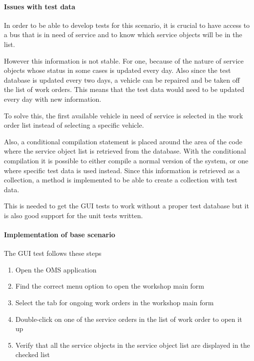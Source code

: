 \documentclass{article}
\begin{document}
				\paragraph{Issues with test data}
				
				In order to be able to develop tests for this scenario, it is crucial to have access to a bus that is in need of service and to know which service objects will be in the list. 

				However this information is not stable. For one, because of the nature of service objects whose status in some cases is updated every day. Also since the test database is updated every two days, a vehicle can be repaired and be taken off the list of work orders. This means that the test data would need to be updated every day with new information.

				To solve this, the first available vehicle in need of service is selected in the work order list instead of selecting a specific vehicle. 

				Also, a conditional compilation statement is placed around the area of the code where the service object list is retrieved from the database. With the conditional compilation it is possible to either compile a normal version of the system, or one where specific test data is used instead.  Since this information is retrieved as a collection, a method is implemented to be able to create a collection with test data.

				This is needed to get the GUI tests to work without a proper test database but it is also good support for the unit tests written.

				\paragraph{Implementation of base scenario}
				
				The GUI test follows these steps
			
				\begin{enumerate}
					\item Open the OMS application
					\item Find the correct menu option to open the workshop main form
					\item Select the tab for ongoing work orders in the workshop main form
					\item Double-click on one of the service orders in the list of work order to open it up
					\item Verify that all the service objects in the service object list are displayed in the checked list 
				\end{enumerate}
\end{document}
